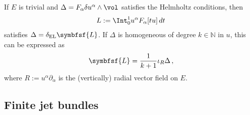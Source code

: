     \begin{example}
        If $E$ is trivial and $\Delta=F_\alpha\delta u^\alpha\wedge\vol$ satisfies the Helmholtz conditions, then
        \begin{gather}
            \label{var:trivial_helmholtz}
            L := \Int_0^1 u^\alpha F_\alpha[tu]\,dt
        \end{gather}
        satisfies $\Delta=\delta_\mathrm{EL}\symbfsf{L}$. If $\Delta$ is homogeneous of degree $k\in\mathbb{N}$ in $u$, this can be expressed as
        \begin{gather}
            \symbfsf{L} = \frac{1}{k+1}\iota_R\Delta\,,
        \end{gather}
        where $R:=u^\alpha\partial_\alpha$ is the (vertically) radial vector field on $E$.
    \end{example}

\subsection{Finite jet bundles}

